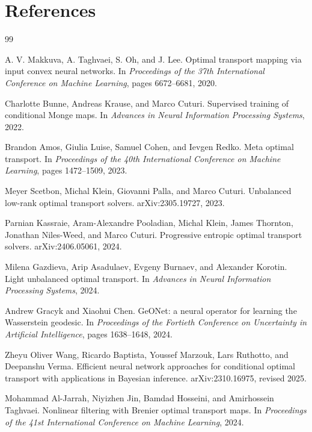 \documentclass[11pt]{report}
\begin{document}
\chapter*{References}
\begin{thebibliography}{99}

A. V. Makkuva, A. Taghvaei, S. Oh, and J. Lee.
\newblock Optimal transport mapping via input convex neural networks.
\newblock In \emph{Proceedings of the 37th International Conference on Machine Learning}, pages 6672--6681, 2020.

Charlotte Bunne, Andreas Krause, and Marco Cuturi.
\newblock Supervised training of conditional Monge maps.
\newblock In \emph{Advances in Neural Information Processing Systems}, 2022.

Brandon Amos, Giulia Luise, Samuel Cohen, and Ievgen Redko.
\newblock Meta optimal transport.
\newblock In \emph{Proceedings of the 40th International Conference on Machine Learning}, pages 1472--1509, 2023.

Meyer Scetbon, Michal Klein, Giovanni Palla, and Marco Cuturi.
\newblock Unbalanced low-rank optimal transport solvers.
\newblock arXiv:2305.19727, 2023.

Parnian Kassraie, Aram-Alexandre Pooladian, Michal Klein, James Thornton, Jonathan Niles-Weed, and Marco Cuturi.
\newblock Progressive entropic optimal transport solvers.
\newblock arXiv:2406.05061, 2024.

Milena Gazdieva, Arip Asadulaev, Evgeny Burnaev, and Alexander Korotin.
\newblock Light unbalanced optimal transport.
\newblock In \emph{Advances in Neural Information Processing Systems}, 2024.

Andrew Gracyk and Xiaohui Chen.
\newblock GeONet: a neural operator for learning the Wasserstein geodesic.
\newblock In \emph{Proceedings of the Fortieth Conference on Uncertainty in Artificial Intelligence}, pages 1638--1648, 2024.

Zheyu Oliver Wang, Ricardo Baptista, Youssef Marzouk, Lars Ruthotto, and Deepanshu Verma.
\newblock Efficient neural network approaches for conditional optimal transport with applications in Bayesian inference.
\newblock arXiv:2310.16975, revised 2025.

Mohammad Al-Jarrah, Niyizhen Jin, Bamdad Hosseini, and Amirhossein Taghvaei.
\newblock Nonlinear filtering with Brenier optimal transport maps.
\newblock In \emph{Proceedings of the 41st International Conference on Machine Learning}, 2024.


\end{thebibliography}
\end{document}
